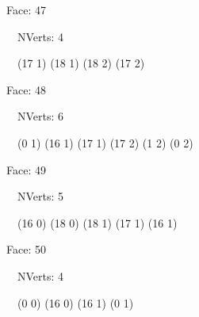 \documentclass{article}
\begin{document}
{\footnotesize 

Face: 47

\   \    NVerts: 4

 \   \   (17 1) (18 1) (18 2) (17 2)}

{\footnotesize 

Face: 48

\   \    NVerts: 6

 \   \   (0 1) (16 1) (17 1) (17 2) (1 2) (0 2)}

{\footnotesize 

Face: 49

\   \    NVerts: 5

 \   \   (16 0) (18 0) (18 1) (17 1) (16 1)}

{\footnotesize 

Face: 50

\   \    NVerts: 4

 \   \   (0 0) (16 0) (16 1) (0 1)}


 \newpage
\end{document}
